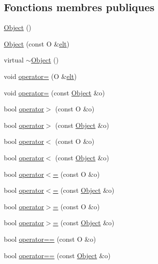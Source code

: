 \subsection*{Fonctions membres publiques}
\begin{DoxyCompactItemize}
\item 
\hyperlink{class_object_a399244a9ba73c47997b5be3693cb497a}{Object} ()
\item 
\hyperlink{class_object_af5e2f97337e0536c71295cf2fc494534}{Object} (const O \&\hyperlink{class_object_ad6c327fe66540b59a513df29f755af4b}{elt})
\item 
virtual \hyperlink{class_object_a01a69e07247d7562664d90815e53b754}{$\sim$\-Object} ()
\item 
void \hyperlink{class_object_ab02a6925b233e2cecc5d05dcb63647b0}{operator=} (O \&\hyperlink{class_object_ad6c327fe66540b59a513df29f755af4b}{elt})
\item 
void \hyperlink{class_object_ab3871ba21ae0189d0c95f370d69bf3af}{operator=} (const \hyperlink{class_object}{Object} \&o)
\item 
bool \hyperlink{class_object_a1bff680d166704176bc6624e14b236fc}{operator$>$} (const O \&o)
\item 
bool \hyperlink{class_object_a285ff5c6899aa00a40caf7394adba387}{operator$>$} (const \hyperlink{class_object}{Object} \&o)
\item 
bool \hyperlink{class_object_a99b754624fdc54c737db3fb9cb629c66}{operator$<$} (const O \&o)
\item 
bool \hyperlink{class_object_ad56b7d529e52f15cb04e2379613cc7be}{operator$<$} (const \hyperlink{class_object}{Object} \&o)
\item 
bool \hyperlink{class_object_a9104e48bac2c6c9e01cef5ef5ce3f4e1}{operator$<$=} (const O \&o)
\item 
bool \hyperlink{class_object_a815b8628a0421c81d5ae55287d5252a4}{operator$<$=} (const \hyperlink{class_object}{Object} \&o)
\item 
bool \hyperlink{class_object_ab4abe75a80657646dbff7843d2d9b657}{operator$>$=} (const O \&o)
\item 
bool \hyperlink{class_object_a05637618e50fc65d1c0d7bf3cd9472dd}{operator$>$=} (const \hyperlink{class_object}{Object} \&o)
\item 
bool \hyperlink{class_object_a99010f4bd7aa5ca78c1eb2641e31f8f9}{operator==} (const O \&o)
\item 
bool \hyperlink{class_object_a266585d94b0deb105465fa7c89e8a1d9}{operator==} (const \hyperlink{class_object}{Object} \&o)

\end{DoxyCompactItemize}
